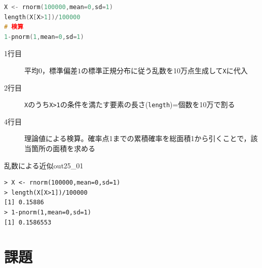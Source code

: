 \documentclass{ltjsarticle}
\begin{document}
\begin{lstlisting}[language=c++,label={code::25_01},caption={近似値と検算}]
X <- rnorm(100000,mean=0,sd=1)
length(X[X>1])/100000
# 検算
1-pnorm(1,mean=0,sd=1)
\end{lstlisting}
\begin{description}
        \item[1行目] 平均$0$，標準偏差$1$の標準正規分布に従う乱数を10万点生成して\texttt{X}に代入
        \item[2行目] \texttt{X}のうち\texttt{X>1}の条件を満たす要素の長さ(\texttt{length})=個数を10万で割る
        \item[4行目] 理論値による検算。確率点1までの累積確率を総面積1から引くことで，該当箇所の面積を求める
    \end{description}

\begin{Rscreen}{乱数による近似}{out25_01}
\begin{verbatim}
> X <- rnorm(100000,mean=0,sd=1)
> length(X[X>1])/100000
[1] 0.15886
> 1-pnorm(1,mean=0,sd=1)
[1] 0.1586553\end{verbatim}
\end{Rscreen}
\section{課題}
\end{document}

